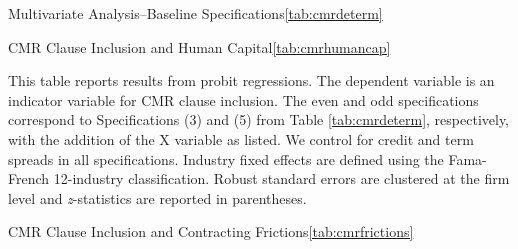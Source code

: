\documentclass[a4paper,12pt]{article}
\begin{document}
\begin{singlespace}
\begin{papertable}{Multivariate Analysis--Baseline Specifications}{\ref{tab:cmrdeterm}}{}
    \startdata
    
\end{papertable}


\begin{papertable}{CMR Clause Inclusion and Human Capital}{\ref{tab:cmrhumancap}}{} \label{tab:cmrhumancap}

    This table reports results from probit regressions.
    The dependent variable is an indicator variable for CMR clause inclusion.
    The even and odd specifications correspond to Specifications (3) and (5) from Table \ref{tab:cmrdeterm}, respectively, with the addition of the X variable as listed.
    We control for credit and term spreads in all specifications.
    Industry fixed effects are defined using the Fama-French 12-industry classification.
    Robust standard errors are clustered at the firm level and \textit{z}-statistics are reported in parentheses.
    \postamble

    \startdata
    
\end{papertable}


\begin{papertable}{CMR Clause Inclusion and Contracting Frictions}{\ref{tab:cmrfrictions}}{}   \label{tab:cmrfrictions}


\end{papertable}
\end{singlespace}
\end{document}
